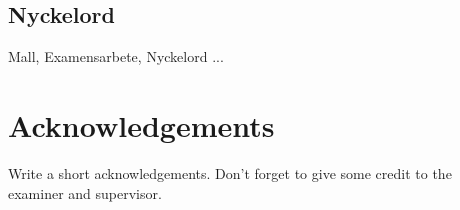 \section*{Nyckelord}
Mall, Examensarbete, Nyckelord ...


\newpage
\thispagestyle{plain}
\chapter*{Acknowledgements}
Write a short acknowledgements. Don't forget to give some credit to the examiner and supervisor.

\newpage



\newpage


\thispagestyle{plain}
\tableofcontents

\newpage


